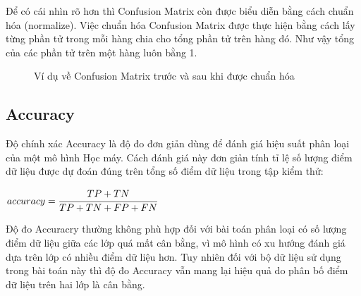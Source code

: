 \documentclass[12pt,a4paper,oneside]{book}
\begin{document}
		Để có cái nhìn rõ hơn thì Confusion Matrix còn được biểu diễn bằng cách chuẩn hóa (normalize). Việc chuẩn hóa Confusion Matrix được thực hiện bằng cách lấy từng phần tử trong mỗi hàng chia cho tổng phần tử trên hàng đó. Như vậy tổng của các phần tử trên một hàng luôn bằng 1.

		\begin{figure}[H]
			\centering
			\hfill
			\caption{Ví dụ về Confusion Matrix trước và sau khi được chuẩn hóa} 
		\end{figure}

	\subsection{Accuracy}
	Độ chính xác Accuracy là độ đo đơn giản dùng để đánh giá hiệu suất phân loại của một mô hình Học máy. Cách đánh giá này đơn giản tính tỉ lệ số lượng điểm dữ liệu được dự đoán đúng trên tổng số điểm dữ liệu trong tập kiểm thử:
	
	\centerline{$accuracy = \cfrac{TP+TN}{TP+TN+FP+FN}$}
	\vspace{1em}
	Độ đo Accuracry thường không phù hợp đối với bài toán phân loại có số lượng điểm dữ liệu giữa các lớp quá mất cân bằng, vì mô hình có xu hướng đánh giá dựa trên lớp có nhiều điểm dữ liệu hơn. Tuy nhiên đối với bộ dữ liệu sử dụng trong bài toán này thì độ đo Accuracy vẫn mang lại hiệu quả do phân bố điểm dữ liệu trên hai lớp là cân bằng.
\end{document}

